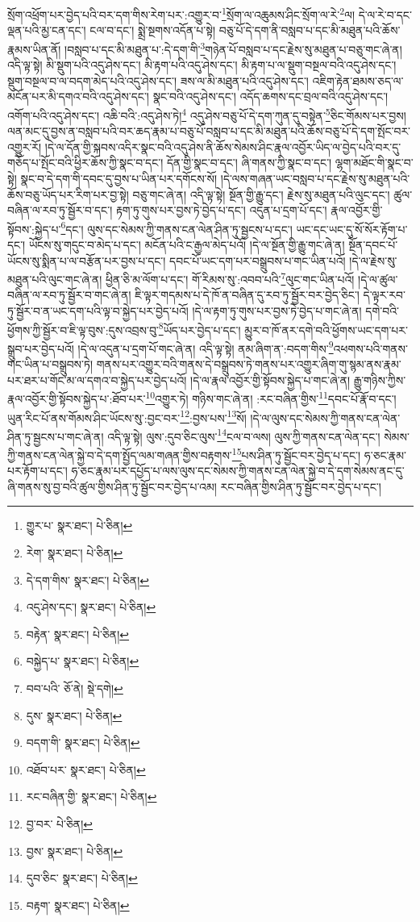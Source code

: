 སྲོག་འཕྲོག་པར་བྱེད་པའི་བར་དག་གིས་རེག་པར་:འགྱུར་བ་\footnote{གྱུར་པ་  སྣར་ཐང་།  པེ་ཅིན། }སྲོག་ལ་འཆུམས་ཤིང་སྲོག་ལ་རེ་\footnote{རེག་  སྣར་ཐང་།  པེ་ཅིན། }ལ། དེ་ལ་རེ་བ་དང་ལྡན་པའི་མྱ་ངན་དང་། ངལ་བ་དང་། སྨྲེ་སྔགས་འདོན་པ་སྟེ། བཅུ་པོ་དེ་དག་ནི་བསླབ་པ་དང་མི་མཐུན་པའི་ཆོས་རྣམས་ཡིན་ནོ། །བསླབ་པ་དང་མི་མཐུན་པ་:དེ་དག་གི་\footnote{དེ་དག་གིས་  སྣར་ཐང་།  པེ་ཅིན། }གཉེན་པོ་བསླབ་པ་དང་རྗེས་སུ་མཐུན་པ་བཅུ་གང་ཞེ་ན། འདི་ལྟ་སྟེ། མི་སྡུག་པའི་འདུ་ཤེས་དང་། མི་རྟག་པའི་འདུ་ཤེས་དང་། མི་རྟག་པ་ལ་སྡུག་བསྔལ་བའི་འདུ་ཤེས་དང་། སྡུག་བསྔལ་བ་ལ་བདག་མེད་པའི་འདུ་ཤེས་དང་། ཟས་ལ་མི་མཐུན་པའི་འདུ་ཤེས་དང་། འཇིག་རྟེན་ཐམས་ཅད་ལ་མངོན་པར་མི་དགའ་བའི་འདུ་ཤེས་དང་། སྣང་བའི་འདུ་ཤེས་དང་། འདོད་ཆགས་དང་བྲལ་བའི་འདུ་ཤེས་དང་། འགོག་པའི་འདུ་ཤེས་དང་། འཆི་བའི་:འདུ་ཤེས་ཏེ།\footnote{འདུ་ཤེས་དང་།  སྣར་ཐང་།  པེ་ཅིན། } འདུ་ཤེས་བཅུ་པོ་དེ་དག་ཀུན་དུ་བསྟེན་\footnote{བརྟེན་  སྣར་ཐང་།  པེ་ཅིན། }ཅིང་གོམས་པར་བྱས། ལན་མང་དུ་བྱས་ན་བསླབ་པའི་བར་ཆད་རྣམ་པ་བཅུ་པོ་བསླབ་པ་དང་མི་མཐུན་པའི་ཆོས་བཅུ་པོ་དེ་དག་སྤོང་བར་འགྱུར་རོ། །དེ་ལ་དོན་གྱི་སྐབས་འདིར་སྣང་བའི་འདུ་ཤེས་ནི་ཆོས་སེམས་ཤིང་རྣལ་འབྱོར་ཡིད་ལ་བྱེད་པའི་བར་དུ་གཅོད་པ་སྤོང་བའི་ཕྱིར་ཆོས་ཀྱི་སྣང་བ་དང་། དོན་གྱི་སྣང་བ་དང་། ཞི་གནས་ཀྱི་སྣང་བ་དང་། ལྷག་མཐོང་གི་སྣང་བ་སྟེ། སྣང་བ་དེ་དག་གི་དབང་དུ་བྱས་པ་ཡིན་པར་དགོངས་སོ། །དེ་ལས་གཞན་ཡང་བསླབ་པ་དང་རྗེས་སུ་མཐུན་པའི་ཆོས་བཅུ་ཡོད་པར་རིག་པར་བྱ་སྟེ། བཅུ་གང་ཞེ་ན། འདི་ལྟ་སྟེ། སྔོན་གྱི་རྒྱུ་དང་། རྗེས་སུ་མཐུན་པའི་ལུང་དང་། ཚུལ་བཞིན་ལ་རབ་ཏུ་སྦྱོར་བ་དང་། རྟག་ཏུ་གུས་པར་བྱས་ཏེ་བྱེད་པ་དང་། འདུན་པ་དྲག་པོ་དང་། རྣལ་འབྱོར་གྱི་སྟོབས་:སྐྱེད་པ་\footnote{བསྐྱེད་པ་  སྣར་ཐང་།  པེ་ཅིན། }དང་། ལུས་དང་སེམས་ཀྱི་གནས་ངན་ལེན་ཤིན་ཏུ་སྦྱངས་པ་དང་། ཡང་དང་ཡང་དུ་སོ་སོར་རྟོག་པ་དང་། ཡོངས་སུ་གདུང་བ་མེད་པ་དང་། མངོན་པའི་ང་རྒྱལ་མེད་པའོ། །དེ་ལ་སྔོན་གྱི་རྒྱུ་གང་ཞེ་ན། སྔོན་དབང་པོ་ཡོངས་སུ་སྨིན་པ་ལ་བརྩོན་པར་བྱས་པ་དང་། དབང་པོ་ཡང་དག་པར་བསྒྲུབས་པ་གང་ཡིན་པའོ། །དེ་ལ་རྗེས་སུ་མཐུན་པའི་ལུང་གང་ཞེ་ན། ཕྱིན་ཅི་མ་ལོག་པ་དང་། གོ་རིམས་སུ་:འབབ་པའི་\footnote{བབ་པའི་  ཅོ་ནེ།  སྡེ་དགེ། }ལུང་གང་ཡིན་པའོ། །དེ་ལ་ཚུལ་བཞིན་ལ་རབ་ཏུ་སྦྱོར་བ་གང་ཞེ་ན། ཇི་ལྟར་གདམས་པ་དེ་ཁོ་ན་བཞིན་དུ་རབ་ཏུ་སྦྱོར་བར་བྱེད་ཅིང་། དེ་ལྟར་རབ་ཏུ་སྦྱོར་བ་ན་ཡང་དག་པའི་ལྟ་བ་སྐྱེད་པར་བྱེད་པའོ། །དེ་ལ་རྟག་ཏུ་གུས་པར་བྱས་ཏེ་བྱེད་པ་གང་ཞེ་ན། དགེ་བའི་ཕྱོགས་ཀྱི་སྦྱོར་བ་ཇི་ལྟ་བུས་:དུས་འབྲས་བུ་\footnote{དུས་  སྣར་ཐང་།  པེ་ཅིན། }ཡོད་པར་བྱེད་པ་དང་། མྱུར་བ་ཁོ་ནར་དགེ་བའི་ཕྱོགས་ཡང་དག་པར་སྒྲུབ་པར་བྱེད་པའོ། །དེ་ལ་འདུན་པ་དྲག་པོ་གང་ཞེ་ན། འདི་ལྟ་སྟེ། ནམ་ཞིག་ན་:བདག་གིས་\footnote{བདག་གི་  སྣར་ཐང་།  པེ་ཅིན། }འཕགས་པའི་གནས་གང་ཡིན་པ་བསྒྲུབས་ཏེ། གནས་པར་འགྱུར་བའི་གནས་དེ་བསྒྲུབས་ཏེ་གནས་པར་འགྱུར་ཞིག་གུ་སྙམ་ནས་རྣམ་པར་ཐར་པ་གོང་མ་ལ་དགའ་བ་སྐྱེད་པར་བྱེད་པའོ། །དེ་ལ་རྣལ་འབྱོར་གྱི་སྟོབས་སྐྱེད་པ་གང་ཞེ་ན། རྒྱུ་གཉིས་ཀྱིས་རྣལ་འབྱོར་གྱི་སྟོབས་སྐྱེད་པ་:ཐོབ་པར་\footnote{འཐོབ་པར་  སྣར་ཐང་།  པེ་ཅིན། }འགྱུར་ཏེ། གཉིས་གང་ཞེ་ན། :རང་བཞིན་གྱིས་\footnote{རང་བཞིན་གྱི་  སྣར་ཐང་།  པེ་ཅིན། }དབང་པོ་རྣོ་བ་དང་། ཡུན་རིང་པོ་ནས་གོམས་ཤིང་ཡོངས་སུ་:བྱང་བར་\footnote{བྱ་བར་  པེ་ཅིན། }:བྱས་པས་\footnote{བྱས་  སྣར་ཐང་།  པེ་ཅིན། }སོ། །དེ་ལ་ལུས་དང་སེམས་ཀྱི་གནས་ངན་ལེན་ཤིན་ཏུ་སྦྱངས་པ་གང་ཞེ་ན། འདི་ལྟ་སྟེ། ལུས་:དུབ་ཅིང་ལུས་\footnote{དུབ་ཅིང་  སྣར་ཐང་།  པེ་ཅིན། }ངལ་བ་ལས། ལུས་ཀྱི་གནས་ངན་ལེན་དང་། སེམས་ཀྱི་གནས་ངན་ལེན་སྐྱེ་བ་དེ་དག་སྤྱོད་ལམ་གཞན་གྱིས་བརྟགས་\footnote{བརྟག་  སྣར་ཐང་།  པེ་ཅིན། }པས་ཤིན་ཏུ་སྦྱོང་བར་བྱེད་པ་དང་། ཧ་ཅང་རྣམ་པར་རྟོག་པ་དང་། ཧ་ཅང་རྣམ་པར་དཔྱོད་པ་ལས་ལུས་དང་སེམས་ཀྱི་གནས་ངན་ལེན་སྐྱེ་བ་དེ་དག་སེམས་ནང་དུ་ཞི་གནས་སུ་བྱ་བའི་ཚུལ་གྱིས་ཤིན་ཏུ་སྦྱོང་བར་བྱེད་པ་འམ། རང་བཞིན་གྱིས་ཤིན་ཏུ་སྦྱོང་བར་བྱེད་པ་དང་། 